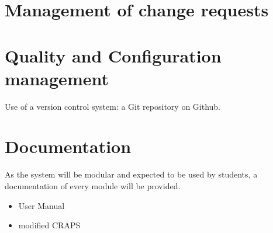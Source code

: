 \documentclass{article}
\begin{document}
  \section{Management of change requests}

  \section{Quality and Configuration management}
    Use of a version control system: a Git repository on Github.

  \section{Documentation}
    As the system will be modular and expected to be used by students, a
    documentation of every module will be provided.

    \begin{itemize}
      \item User Manual
      \item modified CRAPS
    \end{itemize}
\end{document}
